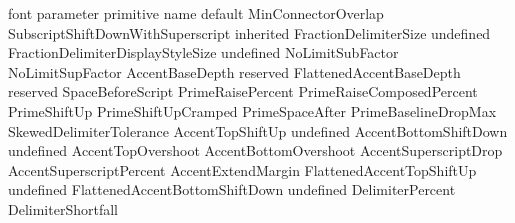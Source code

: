 \starttabulate[|T|T|c|]
\FL
\BC font parameter                    \BC primitive name                               \BC default   \NC \NR
\TL
\NC MinConnectorOverlap               \NC \type {\Umathconnectoroverlapmin}                     \NC \NR
\NC SubscriptShiftDownWithSuperscript \NC \type {\Umathsubsupshiftdown}                \NC inherited \NC \NR
\NC FractionDelimiterSize             \NC \type {\Umathfractiondelsize}                \NC undefined \NC \NR
\NC FractionDelimiterDisplayStyleSize \NC \type {\Umathfractiondelsize}                \NC undefined \NC \NR
\NC NoLimitSubFactor                  \NC \type {\Umathnolimitsubfactor}                        \NC \NR
\NC NoLimitSupFactor                  \NC \type {\Umathnolimitsupfactor}                        \NC \NR
\NC AccentBaseDepth                   \NC \type {\Umathaccentbasedepth}                \NC reserved  \NC \NR
\NC FlattenedAccentBaseDepth          \NC \type {\Umathflattenedaccentbasedepth}       \NC reserved  \NC \NR
\NC SpaceBeforeScript                 \NC \type {\Umathspacebeforescript}                       \NC \NR
\NC PrimeRaisePercent                 \NC \type {\Umathprimeraise}                              \NC \NR
\NC PrimeRaiseComposedPercent         \NC \type {\Umathprimeraisecomposed}                      \NC \NR
\NC PrimeShiftUp                      \NC \type {\Umathprimeshiftup}                            \NC \NR
\NC PrimeShiftUpCramped               \NC \type {\Umathprimeshiftup}                            \NC \NR
\NC PrimeSpaceAfter                   \NC \type {\Umathprimespaceafter}                         \NC \NR
\NC PrimeBaselineDropMax              \NC \type {\Umathprimeshiftdrop}                          \NC \NR
\NC SkewedDelimiterTolerance          \NC \type {\Umathskeweddelimitertolerance}                \NC \NR
\NC AccentTopShiftUp                  \NC \type {\Umathaccenttopshiftup}               \NC undefined \NC \NR
\NC AccentBottomShiftDown             \NC \type {\Umathaccentbottomshiftdown}          \NC undefined \NC \NR
\NC AccentTopOvershoot                \NC \type {\Umathaccenttopovershoot}                      \NC \NR
\NC AccentBottomOvershoot             \NC \type {\Umathaccentbottomovershoot}                   \NC \NR
\NC AccentSuperscriptDrop             \NC \type {\Umathaccentsuperscriptdrop}                   \NC \NR
\NC AccentSuperscriptPercent          \NC \type {\Umathaccentsuperscriptpercent}                \NC \NR
\NC AccentExtendMargin                \NC \type {\Umathaccentextendmargin}                      \NC \NR
\NC FlattenedAccentTopShiftUp         \NC \type {\Umathflattenedaccenttopshiftup}      \NC undefined \NC \NR
\NC FlattenedAccentBottomShiftDown    \NC \type {\Umathflattenedaccentbottomshiftdown} \NC undefined \NC \NR
\NC DelimiterPercent                  \NC \type {\Umathdelimiterpercent}                        \NC \NR
\NC DelimiterShortfall                \NC \type {\Umathdelimitershortfall}                      \NC \NR
\LL
\stoptabulate

